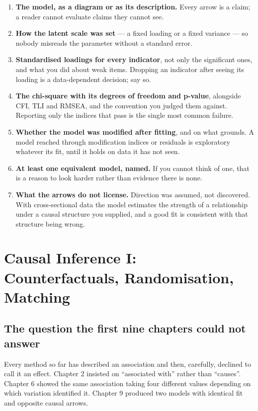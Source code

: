\documentclass[
  letterpaper,
  10pt,
  twoside,
  openright,
  numbers=noenddot,
  chapterprefix=true]{scrbook}
\providecommand{\tightlist}{%
  \setlength{\itemsep}{0pt}\setlength{\parskip}{0pt}}
\begin{document}
\begin{enumerate}
\def\labelenumi{\arabic{enumi}.}
\tightlist
\item
  \textbf{The model, as a diagram or as its description.} Every arrow is
  a claim; a reader cannot evaluate claims they cannot see.
\item
  \textbf{How the latent scale was set} --- a fixed loading or a fixed
  variance --- so nobody misreads the parameter without a standard
  error.
\item
  \textbf{Standardised loadings for every indicator}, not only the
  significant ones, and what you did about weak items. Dropping an
  indicator after seeing its loading is a data-dependent decision; say
  so.
\item
  \textbf{The chi-square with its degrees of freedom and p-value},
  alongside CFI, TLI and RMSEA, and the convention you judged them
  against. Reporting only the indices that pass is the single most
  common failure.
\item
  \textbf{Whether the model was modified after fitting}, and on what
  grounds. A model reached through modification indices or residuals is
  exploratory whatever its fit, until it holds on data it has not seen.
\item
  \textbf{At least one equivalent model, named.} If you cannot think of
  one, that is a reason to look harder rather than evidence there is
  none.
\item
  \textbf{What the arrows do not license.} Direction was assumed, not
  discovered. With cross-sectional data the model estimates the strength
  of a relationship under a causal structure you supplied, and a good
  fit is consistent with that structure being wrong.
\end{enumerate}


\chapter{Causal Inference I: Counterfactuals, Randomisation,
Matching}\label{causal-inference-i-counterfactuals-randomisation-matching}

\section{The question the first nine chapters could not
answer}\label{the-question-the-first-nine-chapters-could-not-answer}

Every method so far has described an association and then, carefully,
declined to call it an effect. Chapter 2 insisted on ``associated with''
rather than ``causes''. Chapter 6 showed the same association taking
four different values depending on which variation identified it.
Chapter 9 produced two models with identical fit and opposite causal
arrows.
\end{document}
